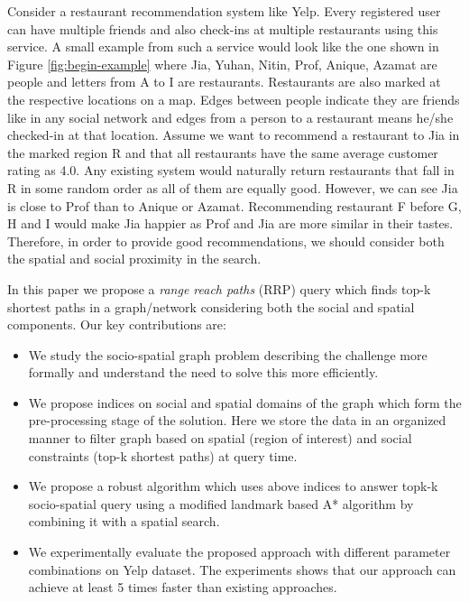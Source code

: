 Consider a restaurant recommendation system like Yelp. Every registered user can have multiple friends and also check-ins at multiple restaurants using this service. A small example from such a service would look like the one shown in Figure \ref{fig:begin-example} where Jia, Yuhan, Nitin, Prof, Anique, Azamat are people and letters from A to I are restaurants. Restaurants are also marked at the respective locations on a map. Edges between people indicate they are friends like in any social network and edges from a person to a restaurant means he/she checked-in at that location. Assume we want to recommend a restaurant to Jia in the marked region R and that all restaurants have the same average customer rating as 4.0. Any existing system would naturally return restaurants that fall in R in some random order as all of them are equally good. However, we can see Jia is close to Prof than to Anique or Azamat. Recommending restaurant F before G, H and I would make Jia happier as Prof and Jia are more similar in their tastes. Therefore, in order to provide good recommendations, we should consider both the spatial and social proximity in the search.

In this paper we propose a \textit{range reach paths} (RRP) query which finds top-k shortest paths in a graph/network considering both the social and spatial components. Our key contributions are:
\begin{itemize}
	\item We study the socio-spatial graph problem describing the challenge more formally and understand the need to solve this more efficiently.
	\item We propose indices on social and spatial domains of the graph which form the pre-processing stage of the solution. Here we store the data in an organized manner to filter graph based on spatial (region of interest) and social constraints (top-k shortest paths) at query time.
	\item We propose a robust algorithm which uses above indices to answer topk-k socio-spatial query using a modified landmark based A* algorithm by combining it with a spatial search.
	\item We experimentally evaluate the proposed approach with different parameter combinations on Yelp dataset. The experiments shows that our approach can achieve at least 5 times faster than existing approaches. %
\end{itemize}

